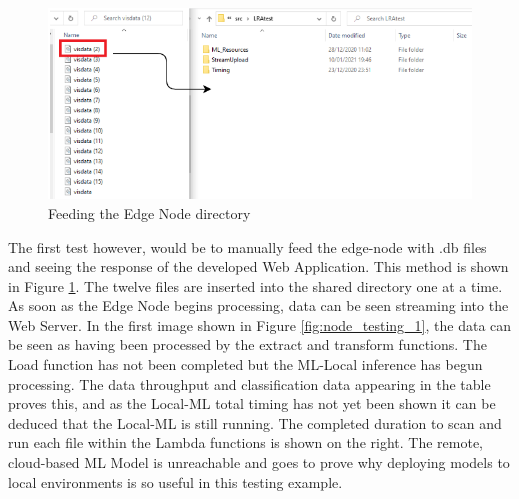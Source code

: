 \begin{figure}[ht]
    \centering
    \includegraphics[width=1\linewidth]{pages/Chapter5/Chapter 5 images/testing_node_js_manually.png}
    \caption{Feeding the Edge Node directory }
    \label{fig:feeding_edge_node_manually}
\end{figure}
The first test however, would be to manually feed the edge-node with .db files and seeing the response of the developed Web Application. This method is shown in Figure \ref{fig:feeding_edge_node_manually}. The twelve files are inserted into the shared directory one at a time. As soon as the Edge Node begins processing, data can be seen streaming into the Web Server. In the first image shown in Figure \ref{fig:node_testing_1}, the data can be seen as having been processed by the extract and transform functions. The Load function has not been completed but the ML-Local inference has begun processing. The data throughput and classification data appearing in the table proves this, and as the Local-ML total timing has not yet been shown it can be deduced that the Local-ML is still running. The completed duration to scan and run each file within the Lambda functions is shown on the right. The remote, cloud-based ML Model is unreachable and goes to prove why deploying models to local environments is so useful in this testing example.
